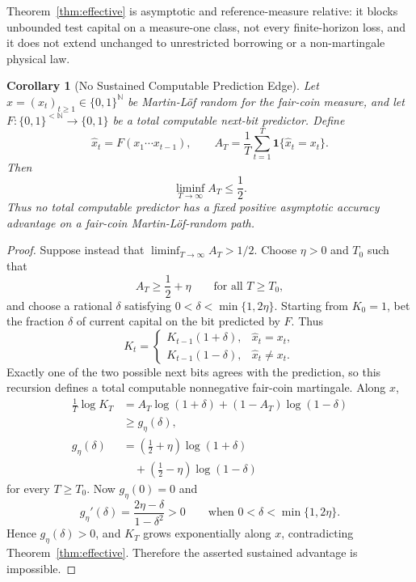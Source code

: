 \documentclass[aps,pra,reprint,superscriptaddress,amsmath,amssymb,floatfix]{revtex4-2}
\theoremstyle{plain}
\newtheorem{corollary}[theorem]{Corollary}
\theoremstyle{definition}
\theoremstyle{remark}
\begin{document}
Theorem~\ref{thm:effective} is asymptotic and reference-measure relative: it
blocks unbounded test capital on a measure-one class, not every finite-horizon
loss, and it does not extend unchanged to unrestricted borrowing or a
non-martingale physical law.

\begin{corollary}[No Sustained Computable Prediction Edge]
  \label{cor:prediction-edge}
  Let \(x=(x_t)_{t\geq1}\in\{0,1\}^{\mathbb N}\) be Martin-L\"of random for
  the fair-coin measure, and let
  \(F\colon\{0,1\}^{<\mathbb N}\to\{0,1\}\) be a total computable next-bit
  predictor. Define
  \[
    \widehat x_t=F(x_1\cdots x_{t-1}),
    \qquad
    A_T=\frac1T\sum_{t=1}^T
      \mathbf 1\{\widehat x_t=x_t\}.
  \]
  Then
  \[
    \liminf_{T\to\infty}A_T\leq\frac12.
  \]
  Thus no total computable predictor has a fixed positive asymptotic accuracy
  advantage on a fair-coin Martin-L\"of-random path.
\end{corollary}

\begin{proof}
Suppose instead that \(\liminf_{T\to\infty}A_T>1/2\). Choose
\(\eta>0\) and \(T_0\) such that
\[
  A_T\geq\frac12+\eta
  \qquad\text{for all }T\geq T_0,
\]
and choose a rational \(\delta\) satisfying
\(0<\delta<\min\{1,2\eta\}\). Starting from \(K_0=1\), bet the fraction
\(\delta\) of current capital on the bit predicted by \(F\). Thus
\[
  K_t=
  \begin{cases}
    K_{t-1}(1+\delta),&\widehat x_t=x_t,\\
    K_{t-1}(1-\delta),&\widehat x_t\neq x_t.
  \end{cases}
\]
Exactly one of the two possible next bits agrees with the prediction, so this
recursion defines a total computable nonnegative fair-coin martingale. Along
\(x\),
\begin{align*}
  \frac1T\log K_T
  &=A_T\log(1+\delta)+(1-A_T)\log(1-\delta)\\
  &\geq g_\eta(\delta),\\
  g_\eta(\delta)
  &=\left(\frac12+\eta\right)\log(1+\delta)\\
  &\quad+\left(\frac12-\eta\right)\log(1-\delta)
\end{align*}
for every \(T\geq T_0\). Now \(g_\eta(0)=0\) and
\[
  g_\eta'(\delta)=\frac{2\eta-\delta}{1-\delta^2}>0
  \qquad\text{when }0<\delta<\min\{1,2\eta\}.
\]
Hence \(g_\eta(\delta)>0\), and \(K_T\) grows exponentially along \(x\),
contradicting Theorem~\ref{thm:effective}. Therefore the asserted sustained
advantage is impossible.
\end{proof}
\end{document}
